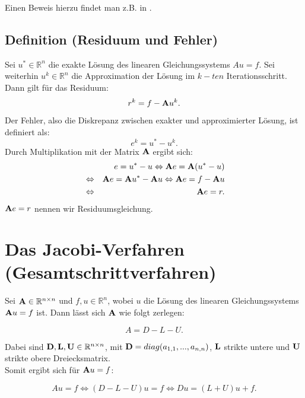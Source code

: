 Einen Beweis hierzu findet man z.B. in \cite{DR5}.

\subsection{Definition (Residuum und Fehler)}\label{ss.Residuum und Fehler}

Sei $u^{*} \in \mathbb{R}^{n}$ die exakte Lösung des linearen Gleichungssystems $Au = f$. Sei weiterhin $u^{k} \in \mathbb{R}^{n}$ die Approximation der Lösung im $k-ten$ Iterationsschritt. Dann gilt für das Residuum:
\begin{equation}
r^{k} = f - {\textbf{A}} u^{k}.\label{eq.Residuum}
\end{equation}
Der Fehler, also die Diskrepanz zwischen exakter und approximierter Lösung, ist definiert als:
\begin{equation}
e^{k} = u^{*} - u^{k}.\label{eq.Fehler}
\end{equation}
Durch Multiplikation mit der Matrix ${\textbf{A}}$ ergibt sich:
\begin{eqnarray}
&&e = u^{*} - u \Leftrightarrow {\textbf{A}}e = {\textbf{A}}(u^{*} - u) \notag \\
&\Leftrightarrow& {\textbf{A}}e = {\textbf{A}} u^{*} - {\textbf{A}} u \Leftrightarrow {\textbf{A}}e = f - {\textbf{A}} u \notag \\
&\Leftrightarrow& {\textbf{A}}e = r.\label{eq.Residuumsgleichung}
\end{eqnarray}
${\textbf{A}}e = r$ nennen wir Residuumsgleichung.

\section{Das Jacobi-Verfahren (Gesamtschrittverfahren)}\label{s.Das Jacobi-Iterationsverfahren}

Sei ${\textbf{A}} \in \mathbb{R}^{n \times n}$ und $f,u \in \mathbb{R}^{n}$, wobei $u$ die Lösung des linearen Gleichungssystems ${\textbf{A}}u = f$ ist. Dann lässt sich ${\textbf{A}}$ wie folgt zerlegen:

\begin{equation}
A = D - L - U.
\end{equation}

Dabei sind ${\textbf{D}},{\textbf{L}},{\textbf{U}} \in \mathbb{R}^{n \times n}$, mit ${\textbf{D}} = diag(a_{1,1},...,a_{n,n})$, ${\textbf{L}}$ strikte untere und ${\textbf{U}}$ strikte obere Dreiecksmatrix. \\
Somit ergibt sich für ${\textbf{A}}u = f$:

\begin{equation}
Au = f \Leftrightarrow (D-L-U)u = f \Leftrightarrow Du = (L+U)u + f.
\end{equation}

